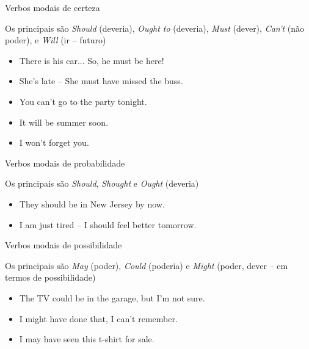 \documentclass[compress,mathserif]{beamer}
\begin{document}

\begin{frame}{Verbos modais de certeza}

Os principais são \textit{Should} (deveria), \textit{Ought to} (deveria), \textit{Must} (dever), \textit{Can’t} (não poder), e \textit{Will} (ir – futuro)

\vspace{0.5cm}

\begin{itemize}
    \item There is his car... So, he must be here!
    \item She’s late – She must have missed the buss.
    \item You can’t go to the party tonight.
    \item It will be summer soon.
    \item I won’t forget you.
\end{itemize}

\end{frame}


\begin{frame}{Verbos modais de probabilidade}

Os principais são \textit{Should}, \textit{Shought} e \textit{Ought} (deveria)

\vspace{0.5cm}

\begin{itemize}
    \item They should be in New Jersey by now.
    \item I am just tired – I should feel better tomorrow.
\end{itemize}

\end{frame}


\begin{frame}{Verbos modais de possibilidade}

Os principais são \textit{May} (poder), \textit{Could} (poderia) e \textit{Might} (poder, dever – em termos de possibilidade)

\vspace{0.5cm}

\begin{itemize}
    \item The TV could be in the garage, but I’m not sure.
    \item I might have done that, I can’t remember.
    \item I may have seen this t-shirt for sale.
\end{itemize}

\end{frame}
\end{document}
